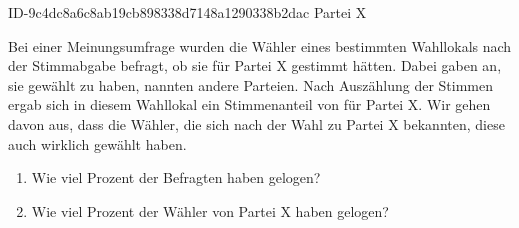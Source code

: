 \begin{exercise}
      {ID-9c4dc8a6c8ab19cb898338d7148a1290338b2dac}
      {Partei X}
  \ifproblem\problem\par
    Bei einer Meinungsumfrage wurden die Wähler eines bestimmten Wahllokals
    nach der Stimmabgabe befragt, ob sie für Partei X gestimmt hätten.
    Dabei gaben  an, sie gewählt zu haben,  nannten andere
    Parteien. Nach Auszählung der Stimmen ergab sich in diesem Wahllokal
    ein Stimmenanteil von  für Partei X. Wir gehen davon aus,
    dass die Wähler, die sich nach der Wahl zu Partei X bekannten,
    diese auch wirklich gewählt haben.
    \begin{enumerate}
      \item Wie viel Prozent der Befragten haben gelogen?
      \item Wie viel Prozent der Wähler von Partei X haben gelogen?
    \end{enumerate}
  \fi
\end{exercise}
